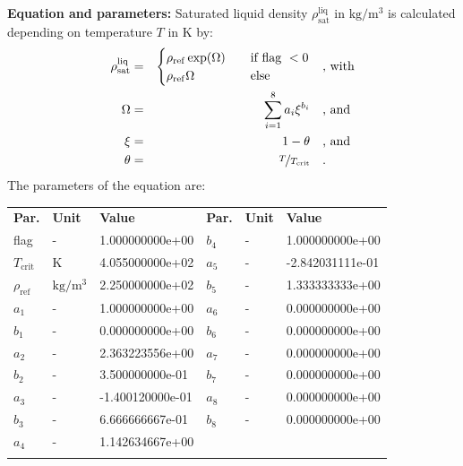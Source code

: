 \textbf{Equation and parameters:}
\newline
%
Saturated liquid density $\rho_\mathrm{sat}^\mathrm{liq}$ in $\si{\kilogram\per\cubic\meter}$ is calculated depending on temperature $T$ in $\si{\kelvin}$ by:
%
\begin{equation*}
\begin{split}
\rho_\mathrm{sat}^\mathrm{liq} &=& \begin{cases} \rho_\mathrm{ref} \exp(\Omega) & \quad \text{if flag } < 0 \\ \rho_\mathrm{ref} \Omega & \quad \text{else} \end{cases} & \quad\text{, with} \\
\Omega &=& \sum_{i=1}^{8} a_i \xi^{b_i} & \quad\text{, and} \\
\xi &=& 1 - \theta & \quad\text{, and} \\
\theta &=& \nicefrac{T}{T_\mathrm{crit}} & \quad\text{.}
\end{split}
\end{equation*}
%
The parameters of the equation are:
%
\begin{longtable}[l]{lll|lll}
\toprule
\addlinespace
\textbf{Par.} & \textbf{Unit} & \textbf{Value} &	\textbf{Par.} & \textbf{Unit} & \textbf{Value} \\
\addlinespace
\midrule
\endhead

\bottomrule
\endfoot
\bottomrule
\endlastfoot
\addlinespace

flag & - & 1.000000000e+00 & $b_4$ & - & 1.000000000e+00 \\
$T_\mathrm{crit}$ & $\si{\kelvin}$ & 4.055000000e+02 & $a_5$ & - & -2.842031111e-01 \\
$\rho_\mathrm{ref}$ & $\si{\kilogram\per\cubic\meter}$ & 2.250000000e+02 & $b_5$ & - & 1.333333333e+00 \\
$a_1$ & - & 1.000000000e+00 & $a_6$ & - & 0.000000000e+00 \\
$b_1$ & - & 0.000000000e+00 & $b_6$ & - & 0.000000000e+00 \\
$a_2$ & - & 2.363223556e+00 & $a_7$ & - & 0.000000000e+00 \\
$b_2$ & - & 3.500000000e-01 & $b_7$ & - & 0.000000000e+00 \\
$a_3$ & - & -1.400120000e-01 & $a_8$ & - & 0.000000000e+00 \\
$b_3$ & - & 6.666666667e-01 & $b_8$ & - & 0.000000000e+00 \\
$a_4$ & - & 1.142634667e+00 & & & \\

\addlinespace\end{longtable}

